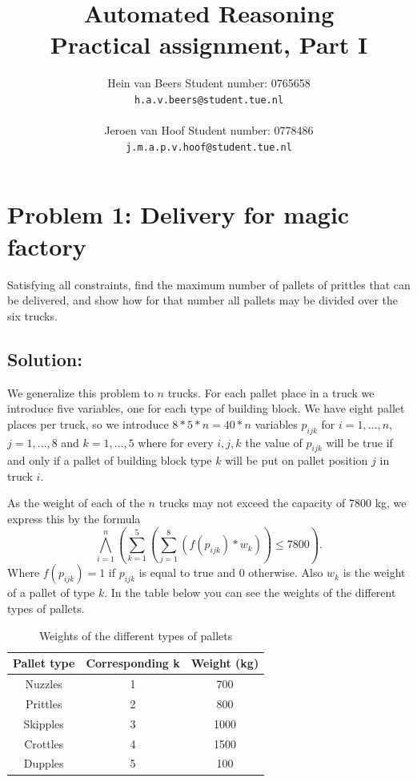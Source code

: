 \documentclass[a4paper]{article}
\author{Hein van Beers \qquad Student number: 0765658 \\{\tt h.a.v.beers@student.tue.nl}\\ \\ Jeroen van Hoof \qquad Student number: 0778486 \\{\tt j.m.a.p.v.hoof@student.tue.nl}}
\title{Automated Reasoning\\
	 \large Practical assignment, Part I}
\begin{document}
	\maketitle
	
	\section*{Problem 1: Delivery for magic factory}
	Satisfying all constraints, find the maximum number of pallets of prittles that can be delivered, and show how for that number all pallets may be divided over the six trucks.
	
	\subsection*{Solution:}
	We generalize this problem to $n$ trucks. For each pallet place in a truck we introduce five variables, one for each type of building block. We have eight pallet places per truck, so we introduce $8*5*n = 40*n$ variables $p_{ijk}$ for $i = 1,\ldots,n$, $j = 1,\ldots,8$ and $k = 1,\ldots,5$ where for every $i,j,k$ the value of $p_{ijk}$ will be true if and only if a pallet of building block type $k$ will be put on pallet position $j$ in truck $i$.
	
	As the weight of each of the $n$ trucks may not exceed the capacity of 7800 kg, we express this by the formula
\[ \bigwedge_{i=1}^n (\sum_{k=1}^5 (\sum_{j=1}^8 (f(p_{ijk})*w_k)) \leq 7800).\]
Where $f(p_{ijk}) = 1$ if $p_{ijk}$ is equal to true and 0 otherwise. Also $w_k$ is the weight of a pallet of type $k$. In the table below you can see the weights of the different types of pallets.

\begin{table}[H]
\centering
\caption{Weights of the different types of pallets}
\label{my-label}
\begin{tabular}{c|c|c}
\textbf{Pallet type} & \textbf{Corresponding k} & \textbf{Weight (kg)} \\ \hline
Nuzzles              & 1                        & 700                  \\ \hline
Prittles             & 2                        & 800                  \\ \hline
Skipples             & 3                        & 1000                 \\ \hline
Crottles             & 4                        & 1500                 \\ \hline
Dupples              & 5                        & 100                 
\end{tabular}
\end{table}
\end{document}
